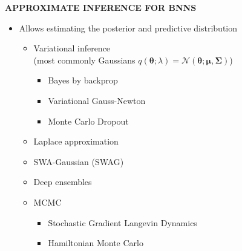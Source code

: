 \begin{whitebox}{\textbf{APPROXIMATE INFERENCE FOR BNNS}}
    \begin{itemize}
        \item Allows estimating the posterior and predictive distribution
        \begin{itemize}
            \item Variational inference\\
            (most commonly Gaussians $q(\bm{\theta};\lambda)=\mathcal{N}(\bm{\theta};\bm{\mu},\bm{\Sigma})$)
            \begin{itemize}
                \item Bayes by backprop
                \item Variational Gauss-Newton
                \item Monte Carlo Dropout
            \end{itemize}
            \item Laplace approximation
            \item SWA-Gaussian (SWAG)
            \item Deep ensembles
            \item MCMC
            \begin{itemize}
                \item Stochastic Gradient Langevin Dynamics
                \item Hamiltonian Monte Carlo
            \end{itemize}
        \end{itemize}
    \end{itemize}
\end{whitebox}

